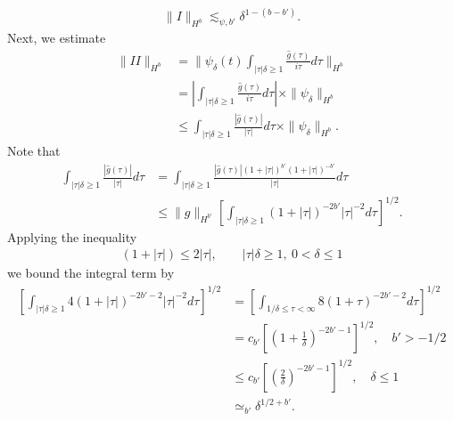 \documentclass[12pt,reqno]{amsart}
\numberwithin{equation}{section}  %
\newcommand{\wh}{\widehat}
\begin{document}
\begin{appendices}
\begin{equation}
\begin{split}
  \| I \|_{H^{b}} \lesssim_{\psi, b'} \delta^{1 - (b - b')}.
\end{split}
\label{rom-1}
\end{equation}
%
%
Next, we estimate
%
%
\begin{equation}
  \label{est-II}
\begin{split}
  \| II \|_{H^{b}}
  & = \| \psi_{\delta}(t) \int_{| \tau |\delta \ge 1} \frac{\wh{g}(\tau)}{i
  \tau} d \tau \|_{H^{b}}
  \\
  & = | \int_{| \tau | \delta \ge 1} \frac{\wh{g}(\tau)}{i \tau} d \tau | \times \| \psi_{\delta}
  \|_{H^{b}}
  \\
  & \le \int_{| \tau |\delta \ge 1} \frac{| \wh{g}(\tau)|}{ |\tau|} d \tau  \times \| \psi_{\delta}
  \|_{H^{b}}.
\end{split}
\end{equation}
%
%
Note that 
%
%
\begin{equation*}
\begin{split}
\int_{| \tau |\delta \ge 1} \frac{| \wh{g}(\tau)|}{ |\tau|} d \tau 
& = \int_{| \tau |\delta \ge 1} \frac{| \wh{g}(\tau)| (1 + | \tau |)^{b'} (1 + | \tau
|)^{-b'}}{ |\tau|} d \tau 
\\
& \le \|g\|_{H^{b'}} \left[ \int_{| \tau | \delta \ge 1} (1 + | \tau |)^{-2b'} | \tau
|^{-2} d \tau \right]^{1/2}.
\end{split}
\end{equation*}
%
%
Applying the inequality 
%
%
\begin{equation}
  \label{sob-term-bound}
\begin{split}
(1 + | \tau |) \le 2 | \tau |, \qquad | \tau |\delta \ge 1, \ 0 < \delta \le 1
\end{split}
\end{equation}
we bound the integral term by
%
%
%
%
\begin{equation*}
\begin{split}
\left[ \int_{| \tau | \delta \ge 1} 4 (1 + | \tau |)^{-2b'-2} | \tau
|^{-2} d \tau \right]^{1/2}
& = \left[ \int_{1/\delta \le  \tau < \infty } 8 (1 +  \tau )^{-2b'-2} 
d \tau \right]^{1/2}
\\
& = c_{b'} \left [ \left( 1 + \frac{1}{\delta} \right)^{-2b' -1} \right ] ^{1/2}, \quad b'> -1/2
\\
& \le c_{b'} \left [ \left (\frac{2}{\delta} \right )^{-2b' -1} \right ]^{1/2}, \quad \delta \le 1
\\
& \simeq_{b'} \delta^{1/2 + b'}.
\end{split}

\end{equation*}
\end{appendices}
\end{document}
